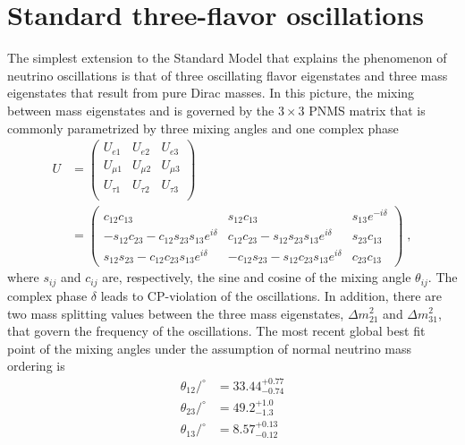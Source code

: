 \section{Standard three-flavor oscillations}
The simplest extension to the Standard Model that explains the phenomenon of neutrino oscillations is that of three oscillating flavor eigenstates and three mass eigenstates that result from pure Dirac masses. In this picture, the mixing between mass eigenstates and is governed by the $3\times3$ PNMS matrix that is commonly parametrized by three mixing angles and one complex phase
\begin{equation}
\begin{aligned}
    U &=
    \begin{pmatrix}
    U_{e1}    & U_{e2}    & U_{e3}    \\
    U_{\mu1}  & U_{\mu2}  & U_{\mu3}  \\
    U_{\tau1} & U_{\tau2} & U_{\tau3} \\
    \end{pmatrix} \\
    &=
    \begin{pmatrix}
        c_{12} c_{13} & s_{12} c_{13} & s_{13}e^{-i\delta}       \\
        -s_{12}c_{23} - c_{12}s_{23}s_{13}e^{i\delta} & c_{12}c_{23}-s_{12}s_{23}s_{13}e^{i\delta} & s_{23}c_{13} \\
        s_{12}s_{23}-c_{12}c_{23}s_{13}e^{i\delta} & -c_{12}s_{23}-s_{12}c_{23}s_{13}e^{i\delta} & c_{23}c_{13}
    \end{pmatrix}\;,
\end{aligned}
\end{equation}
where $s_{ij}$ and $c_{ij}$ are, respectively, the sine and cosine of the mixing angle $\theta_{ij}$. The complex phase $\delta$ leads to CP-violation of the oscillations. In addition, there are two mass splitting values between the three mass eigenstates, $\Delta m^2_{21}$ and $\Delta m^2_{31}$, that govern the frequency of the oscillations. 
The most recent global best fit point\cite{Esteban:2020cvm} of the mixing angles under the assumption of normal neutrino mass ordering is
\begin{equation}
    \begin{aligned}
        \theta_{12}/^\circ &= 33.44^{+0.77}_{-0.74} \\
        \theta_{23}/^\circ &= 49.2^{+1.0}_{-1.3} \\
        \theta_{13}/^\circ &= 8.57^{+0.13}_{-0.12}\\
    \end{aligned}
\end{equation}
